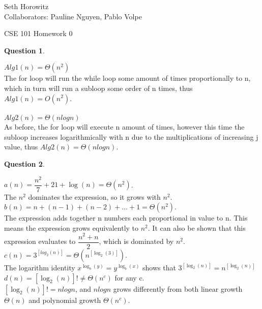 \documentclass{article}
\newtheorem{ques}{Question}
\begin{document}
\begin{flushright}
Seth Horowitz \\
Collaborators: Pauline Nguyen, Pablo Volpe\\
\end{flushright}

\begin{center} \begin{LARGE}
CSE 101 Homework 0\\
\end{LARGE} \end{center}

\begin{ques} \end{ques}
\noindent $Alg1(n) = \Theta(n^2)$\\
The for loop will run the while loop some amount of times proportionally to n, which in turn will run a subloop some order of n times, thus $Alg1(n) = O(n^2)$.\\
\\
$Alg2(n) = \Theta(nlogn)$\\
As before, the for loop will execute n amount of times, however this time the subloop increases logarithmically with n due to the multiplications of increasing j value, thus $Alg2(n) = \Theta(nlogn)$.

\begin{ques}
\end{ques}

\noindent$a(n) = \dfrac{n^2}{7} + 21 + \log(n) = \Theta(n^2)$.\\
The $n^2$ dominates the expression, so it grows with $n^2$.\\

\noindent$b(n) = n + (n-1) + (n-2) + \ldots + 1 = \Theta(n^2)$.\\
The expression adds together n numbers each proportional in value to n. This means the expression grows equivalently to $n^2$. It can also be shown that this expression evaluates to $\dfrac{n^2 + n}{2}$, which is dominated by $n^2$.\\

\noindent$c(n)= 3^{[log_2(n)]} = \Theta(n^{[\log_2(3)]})$.\\
The logarithm identity $x^{\log_b(y)} = y^{\log_b(x)}$ shows that $3^{[\log_2(n)]} = n^{[\log_2(n)]}$\\

\noindent $d(n) = [\log_2(n)]! \neq \Theta(n^c)$ for any c.\\
$[\log_2(n)]! = nlogn$, and $nlogn$ grows differently from both linear growth $\Theta(n)$ and polynomial growth $\Theta(n^c)$.\\
\end{document}

